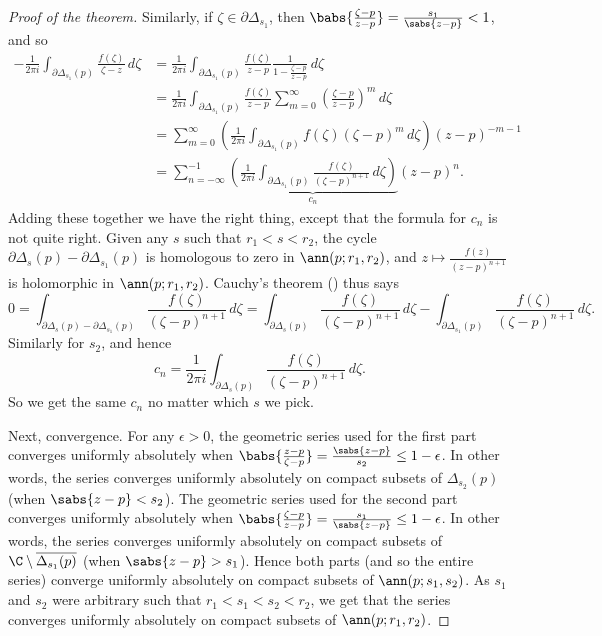 \begin{proof}[Proof of the theorem]
Similarly, 
if $\zeta \in \partial \Delta_{s_1}$, then
$\babs{\frac{\zeta-p}{z-p}} = \frac{s_1}{\sabs{z-p}} < 1$, and so
\begin{equation*}
\begin{split}
-\frac{1}{2\pi i}
\int_{\partial \Delta_{s_1}(p)} \frac{f(\zeta)}{\zeta-z} \, d\zeta 
& = 
\frac{1}{2\pi i}
\int_{\partial \Delta_{s_1}(p)} \frac{f(\zeta)}{z-p}
\frac{1}{1-\frac{\zeta-p}{z-p}} \, d\zeta
\\
& =
\frac{1}{2\pi i}
\int_{\partial \Delta_{s_1}(p)} \frac{f(\zeta)}{z-p}
\sum_{m=0}^\infty
{\left(\frac{\zeta-p}{z-p}\right)}^m \, d\zeta
\\
& =
\sum_{m=0}^\infty
\left(
\frac{1}{2\pi i}
\int_{\partial \Delta_{s_1}(p)} f(\zeta){(\zeta-p)}^{m}
 \, d\zeta
\right)
{(z-p)}^{-m-1}
\\
& =
\sum_{n=-\infty}^{-1}
\underbrace{
\left(
\frac{1}{2\pi i}
\int_{\partial \Delta_{s_1}(p)} \frac{f(\zeta)}{{(\zeta-p)}^{n+1}}
 \, d\zeta
\right)
}_{c_n}
{(z-p)}^{n} .
\end{split}
\end{equation*}
Adding these together we have the right thing, except that the formula for $c_n$
is not quite right.  Given any $s$ such that
$r_1 < s < r_2$,
the cycle
$\partial \Delta_{s}(p) - \partial \Delta_{s_1}(p)$ is homologous to zero in
$\ann(p;r_1,r_2)$, and 
$z \mapsto \frac{f(z)}{{(z-p)}^{n+1}}$ is holomorphic in 
$\ann(p;r_1,r_2)$.  Cauchy's theorem () thus says
\begin{equation*}
0 = \int_{\partial \Delta_{s}(p) - \partial \Delta_{s_1}(p)}
\frac{f(\zeta)}{{(\zeta-p)}^{n+1}} \, d\zeta
=
\int_{\partial \Delta_{s}(p)}
\frac{f(\zeta)}{{(\zeta-p)}^{n+1}} \, d\zeta
-
\int_{\partial \Delta_{s_1}(p)}
\frac{f(\zeta)}{{(\zeta-p)}^{n+1}} \, d\zeta .
\end{equation*}
Similarly for $s_2$, and hence
\begin{equation*}
c_n = \frac{1}{2\pi i}
\int_{\partial \Delta_{s}(p)} \frac{f(\zeta)}{{(\zeta-p)}^{n+1}}
 \, d\zeta .
\end{equation*}
So we get the same $c_n$ no matter which $s$ we pick.

Next, convergence.
For any $\epsilon > 0$,
the geometric series used for the first part converges uniformly
absolutely when $\babs{\frac{z-p}{\zeta-p}} = \frac{\sabs{z-p}}{s_2} \leq
1-\epsilon$.  In other words, the series converges uniformly absolutely
on compact subsets of $\Delta_{s_2}(p)$ (when $\sabs{z-p} < s_2$).
%
The geometric series used for the second part converges uniformly
absolutely when $\babs{\frac{\zeta-p}{z-p}} = \frac{s_1}{\sabs{z-p}} \leq
1-\epsilon$.  In other words, the series converges uniformly absolutely
on compact subsets of $\C \setminus \overline{\Delta_{s_1}(p)}$
(when $\sabs{z-p} > s_1$).
Hence both parts (and so the entire series) 
converge uniformly absolutely on compact
subsets of $\ann(p;s_1,s_2)$.  As $s_1$ and $s_2$ were arbitrary such that
$r_1 < s_1 < s_2 < r_2$, we get that the series
converges uniformly absolutely on compact subsets of $\ann(p;r_1,r_2)$.


\end{proof}
